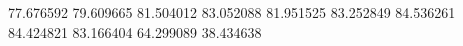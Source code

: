 77.676592
79.609665
81.504012
83.052088
81.951525
83.252849
84.536261
84.424821
83.166404
64.299089
38.434638
